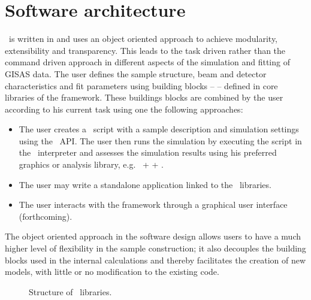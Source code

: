 \newpage
\chapter{Software architecture}
 

\BornAgain\ is written in 
and uses an object oriented approach to 
achieve modularity, extensibility and transparency.
This leads to the task driven rather than the command driven approach in 
different aspects of the simulation and fitting of GISAS data.
The user defines the sample structure, beam and detector characteristics and
fit parameters using building
blocks --  -- defined in core libraries of the framework.
These buildings blocks are combined by the user according to his current
task using one the following approaches:
\begin{itemize}
\item The user creates a \Python\ script with a sample description and simulation settings
using the \BornAgain\ API.
The user then runs the simulation by executing the script in the \Python\ interpreter and assesses the
simulation results using his preferred graphics or analysis library, e.g. \Python\ +  + .
\item The user may write a standalone  application linked to the \BornAgain\ libraries.
\item The user interacts with the framework through a graphical 
user interface (forthcoming).
\end{itemize}

The object oriented approach in the software design allows users 
to have a much higher level of flexibility in the sample construction; it also
decouples the building blocks used in the internal calculations and thereby facilitates the creation of new models,
with little or no modification to the existing code. 


\begin{figure}[htbp]
\centering
\caption{
Structure of \BornAgain\ libraries.
}
\label{fig:two_ratios}
\end{figure}


